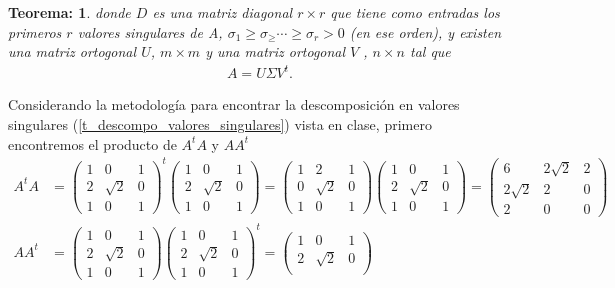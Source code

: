 \documentclass[11pt,letterpaper]{article}
\newtheorem{thmt}{Teorema:}
\begin{document}
\begin{enumerate}
\begin{framed}
\begin{thmt}
donde $D$ es una matriz diagonal $r \times r$ que tiene como entradas los primeros $r$ valores singulares de A,  $\sigma_1 \geq \sigma_ \geq \cdots \geq  \sigma_r > 0$  (en ese orden), y existen una matriz ortogonal $U$, $m \times m$ y una matriz ortogonal $V$ , $n \times n$ tal que
	\begin{align*}
	A=U\Sigma V^t.
	\end{align*}
	    \end{thmt}
\end{framed}
Considerando la metodología para encontrar la descomposición en valores singulares (\ref{t_descompo_valores_singulares}) vista en clase, primero encontremos el producto de $A^tA$ y $AA^t$
\begin{align*}
A^tA& =\begin{pmatrix}
1 & 0 & 1\\
2 & \sqrt{2} & 0\\
1 & 0 & 1
\end{pmatrix}^t \begin{pmatrix}
1 & 0 & 1\\
2 & \sqrt{2} & 0\\
1 & 0 & 1
\end{pmatrix}=\begin{pmatrix}
1 & 2 & 1\\
0 & \sqrt{2} & 0\\
1 & 0 & 1
\end{pmatrix} \begin{pmatrix}
1 & 0 & 1\\
2 & \sqrt{2} & 0\\
1 & 0 & 1
\end{pmatrix} = \begin{pmatrix}
6 & 2\sqrt{2} & 2\\
2\sqrt{2} & 2 & 0\\
2 & 0 & 0
\end{pmatrix}\\
AA^t& =\begin{pmatrix}
1 & 0 & 1\\
2 & \sqrt{2} & 0\\
1 & 0 & 1
\end{pmatrix}\begin{pmatrix}
1 & 0 & 1\\
2 & \sqrt{2} & 0\\
1 & 0 & 1
\end{pmatrix}^t =\begin{pmatrix}
1 & 0 & 1\\
2 & \sqrt{2} & 0\\

\end{pmatrix}
\end{align*}
\end{enumerate}
\end{document}
